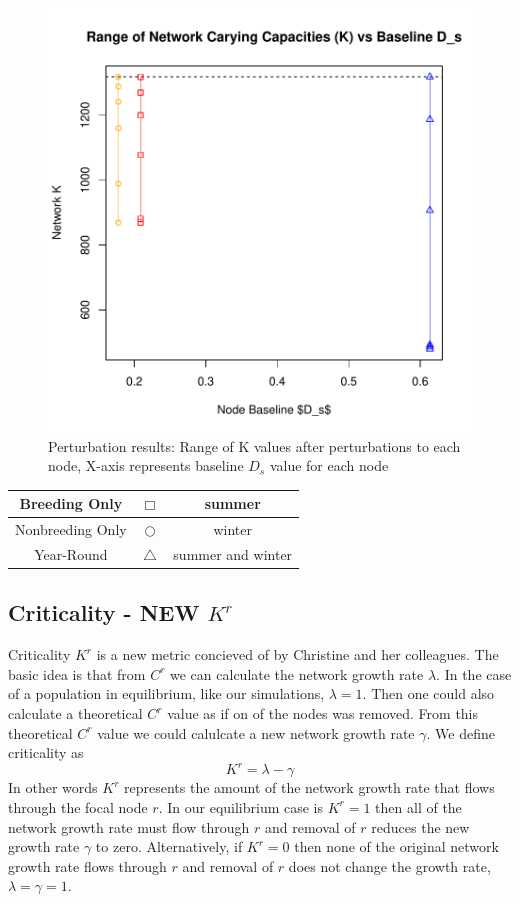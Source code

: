 \documentclass[10pt]{article}
\begin{document}
\vspace{-.5cm}
\begin{figure}[H]
\begin{center}
\includegraphics[width=.8\textwidth, height=.8\textwidth]{RGraphics-elk_barcr_DS}
\caption{Perturbation results: Range of K values after perturbations to each node, X-axis represents baseline $D_s$ value for each node}\label{fig:elk_barcr_DS}
\end{center}
\end{figure}

\vspace{-.5cm}
\begin{tabular}{|c|c|c|}
\hline
{\color{red} Breeding Only} & $\Box$ & summer \\
\hline
{\color{orange} Nonbreeding Only} & $\bigcirc$ & winter \\
\hline
{\color{blue} Year-Round} & $\triangle$ &  summer and winter \\
\hline
\end{tabular}






\newpage
\subsection{Criticality - NEW \texorpdfstring{$K^r$}{KR}}

Criticality $K^r$ is a new metric concieved of by Christine and her colleagues. The basic idea is that from $C^r$ we can calculate the network growth rate $\lambda$. In the case of a population in equilibrium, like our simulations, $\lambda = 1$. Then one could also calculate a theoretical $C^r$ value as if on of the nodes was removed. From this theoretical $C^r$ value we could calulcate a new network growth rate $\gamma$. We define criticality as 
\[K^r = \lambda - \gamma \]
In other words $K^r$ represents the amount of the network growth rate that flows through the focal node $r$. In our equilibrium case is $K^r=1$ then all of the network growth rate must flow through $r$ and removal of $r$ reduces the new growth rate $\gamma$ to zero. Alternatively, if $K^r=0$ then none of the original network growth rate flows through $r$ and removal of $r$ does not change the growth rate, $\lambda=\gamma=1$.
\end{document}
